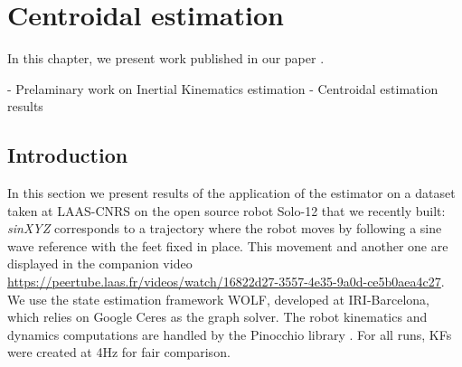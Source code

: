 \chapter{Centroidal estimation}
\minitoc

In this chapter, we present work published in our paper \cite{fourmy2021contact}.

- Prelaminary work on Inertial Kinematics estimation
- Centroidal estimation results

\section{Introduction}


In this section we present results of the application of the estimator on a dataset taken at LAAS-CNRS on the open source robot Solo-12 \cite{grimminger2020open} that we recently built:
\textit{sinXYZ} corresponds to a trajectory where the robot moves by following a sine wave reference with the feet fixed in place. This movement and another one are displayed in the companion video \url{https://peertube.laas.fr/videos/watch/16822d27-3557-4e35-9a0d-ce5b0aea4c27}.
%
We use the state estimation framework WOLF, developed at IRI-Barcelona, which relies on Google Ceres \cite{ceres-solver} as the graph solver. The robot kinematics and dynamics computations are handled by the Pinocchio library \cite{carpentier2015pinocchio}. For all runs, KFs were created  at 4Hz for fair comparison.


